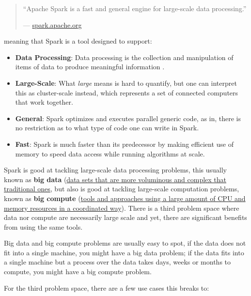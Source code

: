 \documentclass[]{book}
\providecommand{\tightlist}{%
  \setlength{\itemsep}{0pt}\setlength{\parskip}{0pt}}
\theoremstyle{definition}
\theoremstyle{definition}
\theoremstyle{definition}
\theoremstyle{remark}
\begin{document}
\begin{quote}
``Apache Spark is a fast and general engine for large-scale data
processing.''

--- \href{http://spark.apache.org/}{spark.apache.org}
\end{quote}

meaning that Spark is a tool designed to support:

\begin{itemize}
\tightlist
\item
  \textbf{Data Processing}: Data processing is the collection and
  manipulation of items of data to produce meaningful information
  \citep{data-processing}.
\item
  \textbf{Large-Scale}: What \emph{large} means is hard to quantify, but
  one can interpret this as cluster-scale instead, which represents a
  set of connected computers that work together.
\item
  \textbf{General}: Spark optimizes and executes parallel generic code,
  as in, there is no restriction as to what type of code one can write
  in Spark.
\item
  \textbf{Fast}: Spark is much faster than its predecessor by making
  efficient use of memory to speed data access while running algorithms
  at scale.
\end{itemize}

Spark is good at tackling large-scale data processing problems, this
usually known as \textbf{big data}
(\href{https://en.wikipedia.org/wiki/big_data}{data sets that are more
voluminous and complex that traditional ones}, but also is good at
tackling large-scale computation problems, known as \textbf{big compute}
(\href{https://www.nimbix.net/glossary/big-compute/}{tools and
approaches using a large amount of CPU and memory resources in a
coordinated way}). There is a third problem space where data nor compute
are necessarily large scale and yet, there are significant benefits from
using the same tools.

Big data and big compute problems are usually easy to spot, if the data
does not fit into a single machine, you might have a big data problem;
if the data fits into a single machine but a process over the data takes
days, weeks or months to compute, you might have a big compute problem.

For the third problem space, there are a few use cases this breaks to:
\end{document}
